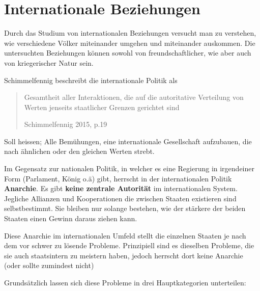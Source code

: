\documentclass[a4paper, 11pt]{article}
\begin{document}
\newpage

\section{Internationale Beziehungen}

Durch das Studium von internationalen Beziehungen versucht man zu verstehen, wie verschiedene Völker miteinander umgehen und miteinander auskommen. Die untersuchten Beziehungen können sowohl von freundschaftlicher, wie aber auch von kriegerischer Natur sein.

\vspace{10px}

Schimmelfennig beschreibt die internationale Politik als \blockquote[Schimmelfennig 2015, p.19]{Gesamtheit aller Interaktionen, die auf die autoritative Verteilung von Werten jenseits staatlicher Grenzen gerichtet sind}. Soll heissen; Alle Bemühungen, eine internationale Gesellschaft aufzubauen, die nach ähnlichen oder den gleichen Werten strebt.

\vspace{10px}

Im Gegensatz zur nationalen Politik, in welcher es eine Regierung in irgendeiner Form (Parlament, König o.ä) gibt, herrscht in der internationalen Politik \textbf{Anarchie}. Es gibt \textbf{keine zentrale Autorität} im internationalen System. Jegliche Allianzen und Kooperationen die zwischen Staaten existieren sind selbstbestimmt. Sie bleiben nur solange bestehen, wie der stärkere der beiden Staaten einen Gewinn daraus ziehen kann.

Diese Anarchie im internationalen Umfeld stellt die einzelnen Staaten je nach dem vor schwer zu lösende Probleme. Prinzipiell sind es dieselben Probleme, die sie auch staatsintern zu meistern haben, jedoch herrscht dort keine Anarchie (oder sollte zumindest nicht)

Grundsätzlich lassen sich diese Probleme in drei Hauptkategorien unterteilen:
\end{document}
